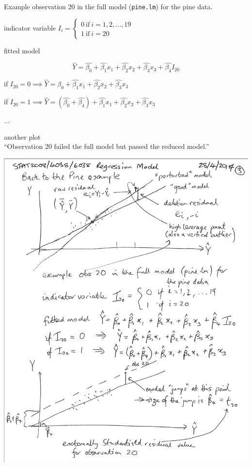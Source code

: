 \documentclass[a4paper, 11pt, twoside]{article}
\begin{document}
Example observation 20 in the full model (\texttt{pine.lm}) for the pine data.

indicator variable $I_i=\begin{cases}
	0\ \text{if}\ i=1,2,\dots, 19\\
	1\ \text{if}\ i=20
\end{cases}$

fitted model

\[\hat{Y}=\hat{\beta_0}+\hat{\beta_1}x_1+\hat{\beta_2}x_2+\hat{\beta_3}x_3+\hat{\beta_4}I_{20}\]

if $I_{20}=0\implies \hat{Y}=\hat{\beta_0}+\hat{\beta_1}x_1+\hat{\beta_2}x_2+\hat{\beta_3}x_3$

if $I_{20}=1\implies \hat{Y}=(\hat{\beta_0}+\hat{\beta_4})+\hat{\beta_1}x_1+\hat{\beta_2}x_2+\hat{\beta_3}x_3$

...

another plot\\

``Observation 20 failed the full model but passed the reduced model.''

\includegraphics[width=\textwidth]{pine2.png}
\end{document}
